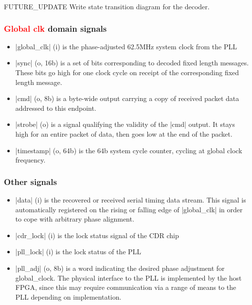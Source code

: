 \documentclass{dune}
\begin{document}
{\color{red}FUTURE\_UPDATE} Write state transition diagram for the decoder.

\subsubsection{\textcolor{red}{Global clk} domain signals}

\begin{itemize}
	\item |global_clk| (i) is the phase-adjusted 62.5MHz system clock from the PLL
	\item |sync| (o, 16b) is a set of bits corresponding to decoded fixed length messages. These bits go high for one clock cycle on receipt of the corresponding fixed length message.
	\item |cmd| (o, 8b) is a byte-wide output carrying a copy of received packet data addressed to this endpoint.
	\item |strobe| (o) is a signal qualifying the validity of the |cmd| output. It stays high for an entire packet of data, then goes low at the end of the packet.
	\item |timestamp| (o, 64b) is the 64b system cycle counter, cycling at global clock frequency.
\end{itemize}

\subsubsection{Other signals}

\begin{itemize}
	\item |data| (i) is the recovered or received serial timing data stream. This signal is automatically registered on the rising or falling edge of |global_clk| in order to cope with arbitrary phase alignment.
	\item |cdr_lock| (i) is the lock status signal of the CDR chip
	\item |pll_lock| (i) is the lock status of the PLL
	\item |pll_adj| (o, 8b) is a word indicating the desired phase adjustment for global\_clock. The physical interface to the PLL is implemented by the host FPGA, since this may require communication via a range of means to the PLL depending on implementation.
\end{itemize}
\end{document}

